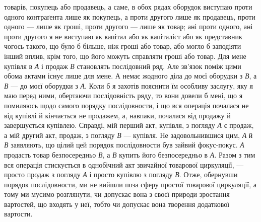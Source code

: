 \parcont{}  %
товарів, покупець або продавець, а саме, в обох рядах оборудок
виступаю проти одного контраґента лише як покупець, а
проти другого лише як продавець, проти одного — лише як
гроші, проти другого — лише як товар; ані проти одного, ані
проти другого я не виступаю як капітал або як капіталіст або
як представник чогось такого, що було б більше, ніж гроші або
товар, або могло б заподіяти інший вплив, крім того, що його
можуть справляти гроші або товар. Для мене купівля в \emph{А} і продаж
\emph{В} становлять послідовний ряд. Але зв’язок поміж цими
обома актами існує лише для мене. А немає жодного діла до моєї
оборудки з \emph{В}, а \emph{В} — до моєї оборудки з \emph{А}. Коли б я захотів
пояснити їм особливу заслугу, яку я маю перед ними, обертаючи
послідовність ряду, то вони довели б мені, що я помиляюсь щодо
самого порядку послідовности, і що вся операція почалася не
від купівлі й кінчається не продажем, а, навпаки, почалася від
продажу й завершується купівлею. Справді, мій перший акт,
купівля, з погляду \emph{А} є продаж, а мій другий акт, продаж, з
погляду \emph{В} — купівля. Не задовольнившися цим, \emph{А} й \emph{В} заявляють,
що цілий цей порядок послідовности був зайвий фокус-покус.
\emph{А} продасть товар безпосередньо \emph{В}, а \emph{В} купить його безпосередньо
в \emph{А}. Разом з тим вся операція стискується в однобічний
акт звичайної товарової циркуляції, — просто продаж з погляду
\emph{А} і просто купівлю з погляду \emph{В}. Отже, обернувши порядок послідовности,
ми не вийшли поза сферу простої товарової циркуляції,
а тому ми мусимо розглянути, чи допускає вона з своєї природи
зростання вартостей, що входять у неї, тобто чи допускає вона
творення додаткової вартости.


